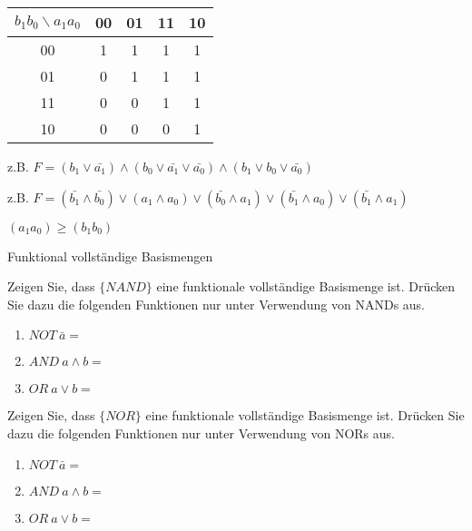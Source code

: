 \documentclass{exercisesheet}
\begin{document}
\begin{solutions}
  \item
  \begin{tabular}{c|cccc}
    $b_1b_0 \backslash a_1a_0$ & 00 & 01 & 11 & 10 \\
    \hline
    00                         & 1  & 1  & 1  & 1  \\
    01                         & 0  & 1  & 1  & 1  \\
    11                         & 0  & 0  & 1  & 1  \\
    10                         & 0  & 0  & 0  & 1  \\
  \end{tabular}
  \item z.B. $F = (b_1 \lor \bar{a_1}) \land (b_0\lor \bar{a_1}\lor \bar{a_0}) \land (b_1\lor b_0\lor\bar{a_0})$
  \item z.B. $F = (\bar{b_1}\land\bar{b_0}) \lor (a_1\land a_0) \lor (\bar{b_0}\land a_1) \lor (\bar{b_1}\land a_0)\lor(\bar{b_1}\land a_1)$
  \item $(a_1a_0) \geq (b_1b_0)$
\end{solutions}

\begin{exercises}{Funktional vollständige Basismengen}
\item Zeigen Sie, dass $\{NAND\}$ eine funktionale vollständige Basismenge ist. Drücken Sie dazu die folgenden Funktionen nur unter Verwendung von NANDs aus.
\begin{enumerate}
  \item $NOT\ \bar{a} = $
  \item $AND\ a \land b = $
  \item $OR\ a \lor b = $
\end{enumerate}
\item Zeigen Sie, dass $\{NOR\}$ eine funktionale vollständige Basismenge ist. Drücken Sie dazu die folgenden Funktionen nur unter Verwendung von NORs aus.
\begin{enumerate}
  \item $NOT\ \bar{a} = $
  \item $AND\ a \land b = $
  \item $OR\ a \lor b = $
\end{enumerate}
\end{exercises}
\end{document}
